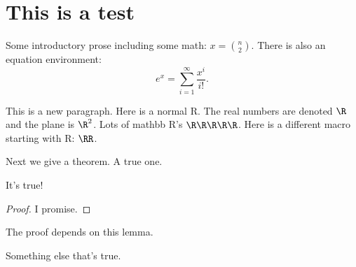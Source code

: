 \section{This is a test} %
\label{sec:this_is_a_test}

Some introductory prose including some math: $x = {n \choose 2}$.
There is also an equation environment:
\[
  e^x = \sum_{i=1}^\infty \frac{x^i}{i!}.
\]

This is a new paragraph. Here is a normal R.
The real numbers are denoted $\R$ and the plane is $\R^2$. Lots of mathbb R's $\R\R\R\R\R$.
Here is a different macro starting with R: $\RR$.

Next we give a theorem.  A true one.

  \begin{theorem}\label{thm:true_theorem}
    It's true!
  \end{theorem}
  \begin{proof}
    I promise.
  \end{proof}

  The proof depends on this lemma.
  
  \begin{lemma}\label{lem:necessary}
    Something else that's true.
  \end{lemma}


